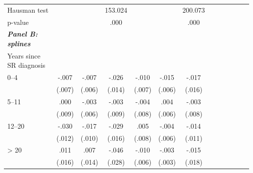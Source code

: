 \documentclass[12pt,english]{article}
\begin{document}
\begin{table}[!ht]
\begin{center}
\begin{adjustbox}{max width=0.8\linewidth}
\begin{threeparttable}
{\begin{tabular}{l*{6}{S
S}}
                Hausman test    &                  &                  &  153.024         &                  &                  &  200.073         \\
                \hspace*{10mm} p-value         &                  &                  &     .000         &                  &                  &     .000         \\
\addlinespace
\textit{\textbf{Panel B: splines}}&&&&&&\\
Years since SR diagnosis  &&&&&&\\
\hspace*{10mm}0--4&    -.007         &    -.007         &    -.026\sym{*}  &    -.010         &    -.015\sym{**} &    -.017         \\
                &   (.007)         &   (.006)         &   (.014)         &   (.007)         &   (.006)         &   (.016)         \\
\hspace*{10mm}5--11&     .000         &    -.003         &    -.003         &    -.004         &     .004         &    -.003         \\
                &   (.009)         &   (.006)         &   (.009)         &   (.008)         &   (.006)         &   (.008)         \\
\hspace*{10mm}12--20&  -.030\sym{**} &    -.017\sym{*}  &    -.029\sym{*}  &     .005         &    -.004         &    -.014         \\
                &   (.012)         &   (.010)         &   (.016)         &   (.008)         &   (.006)         &   (.011)         \\
\hspace*{10mm}> 20&     .011         &     .007         &    -.046\sym{*}  &    -.010\sym{*}  &    -.003         &    -.015         \\
                &   (.016)         &   (.014)         &   (.028)         &   (.006)         &   (.003)         &   (.018)         \\


\end{tabular}}
\end{threeparttable}
\end{adjustbox}
\end{center}
\end{table}
\end{document}
